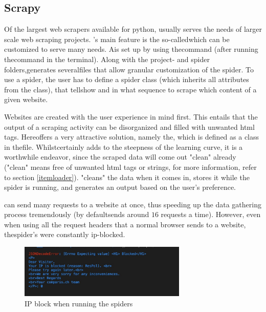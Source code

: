 \documentclass[main]{subfiles}
\begin{document}
\subsection{Scrapy}
Of the largest web scrapers available for python, 
\pkg[Scrapy] usually serves the needs of larger scale web scraping projects.
\pkg[Scrapy]'s main feature is the so-called\pkg[spider]which can be customized to serve many needs.
A\pkg[spider]is set up by using the command 
(after running the command in the terminal).
Along with the project- and spider folders,\pkg[Spider]\hspace{-2pt}generates several\hspace{-1pt}\pkg[.py] 
files that allow granular customization of the spider.
To use a spider, the user has to define a spider class (which inherits all attributes from the class),
that tells\pkg[Scrapy] how and in what sequence to scrape which content of a given website.

Websites are created with the user experience in mind first.
This entails that the output of a scraping activity can be disorganized and filled with unwanted \acs*{html} tags.
Here\pkg[Scrapy] offers a very attractive solution, namely the\pkg[ItemLoader], 
which is defined as a class in the\pkg[items.py] file.
Whilst\pkg[ItemLoader] certainly adds to the steepness of the learning curve, it is a worthwhile endeavor, 
since the scraped data will come out "clean" already ("clean" means free of unwanted \acs*{html} tags or strings, 
for more information, refer to section \ref{itemloader}). 
\pkg[ItemLoader] "cleans" the data when it comes in, stores it while the spider is running, 
and generates an output based on the user's preference.

\pkg[Scrapy] can send many requests to a website at once, 
thus speeding up the data gathering process tremendously (by default\pkg[Scrapy]sends around $16$ requests a time).
However, even when using all the request headers that a normal browser sends to a website, 
the\pkg[Scrapy] spider's were constantly \acs*{ip}-blocked.

\begin{figure}[htbp]
    \centerline{
        \includegraphics[width = 80mm]{prog_2.png}}
    \caption{IP block when running the spiders}
    \label{fig:block}
\end{figure}
\end{document}

